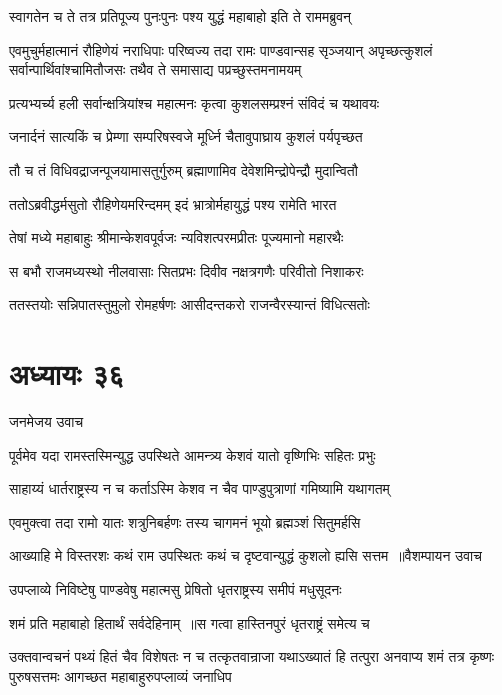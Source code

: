 \twolineshloka
{स्वागतेन च ते तत्र प्रतिपूज्य पुनःपुनः}
{पश्य युद्धं महाबाहो इति ते राममब्रुवन्}


एवमुचुर्महात्मानं रौहिणेयं नराधिपाः
\threelineshloka
{परिष्वज्य तदा रामः पाण्डवान्सह सृञ्जयान्}
{अपृच्छत्कुशलं सर्वान्पार्थिवांश्चामितौजसः}
{तथैव ते समासाद्य पप्रच्छुस्तमनामयम्}


\twolineshloka
{प्रत्यभ्यर्च्य हली सर्वान्क्षत्रियांश्च महात्मनः}
{कृत्वा कुशलसम्प्रश्नं संविदं च यथावयः}


\twolineshloka
{जनार्दनं सात्यकिं च प्रेम्णा सम्परिषस्वजे}
{मूर्ध्नि चैतावुपाघ्राय कुशलं पर्यपृच्छत}


\twolineshloka
{तौ च तं विधिवद्राजन्पूजयामासतुर्गुरुम्}
{ब्रह्माणामिव देवेशमिन्द्रोपेन्द्रौ मुदान्वितौ}


\twolineshloka
{ततोऽब्रवीद्धर्मसुतो रौहिणेयमरिन्दमम्}
{इदं भ्रात्रोर्महायुद्धं पश्य रामेति भारत}


\twolineshloka
{तेषां मध्ये महाबाहुः श्रीमान्केशवपूर्वजः}
{न्यविशत्परमप्रीतः पूज्यमानो महारथैः}


\twolineshloka
{स बभौ राजमध्यस्थो नीलवासाः सितप्रभः}
{दिवीव नक्षत्रगणैः परिवीतो निशाकरः}


\twolineshloka
{ततस्तयोः सन्निपातस्तुमुलो रोमहर्षणः}
{आसीदन्तकरो राजन्वैरस्यान्तं विधित्सतोः}


\chapter{अध्यायः ३६}
\twolineshloka
{जनमेजय उवाच}
{}


\twolineshloka
{पूर्वमेव यदा रामस्तस्मिन्युद्ध उपस्थिते}
{आमन्त्र्य केशवं यातो वृष्णिभिः सहितः प्रभुः}


\twolineshloka
{साहाय्यं धार्तराष्ट्रस्य न च कर्ताऽस्मि केशव}
{न चैव पाण्डुपुत्राणां गमिष्यामि यथागतम्}


\twolineshloka
{एवमुक्त्वा तदा रामो यातः शत्रुनिबर्हणः}
{तस्य चागमनं भूयो ब्रह्मञ्शं सितुमर्हसि}


\threelineshloka
{आख्याहि मे विस्तरशः कथं राम उपस्थितः}
{कथं च दृष्टवान्युद्धं कुशलो ह्यसि सत्तम ॥वैशम्पायन उवाच}
{}


\twolineshloka
{उपप्लाव्ये निविष्टेषु पाण्डवेषु महात्मसु}
{प्रेषितो धृतराष्ट्रस्य समीपं मधुसूदनः}


\twolineshloka
{शमं प्रति महाबाहो हितार्थं सर्वदेहिनाम् ॥स गत्वा हास्तिनपुरं धृतराष्ट्रं समेत्य च}
{}


उक्तवान्वचनं पथ्यं हितं चैव विशेषतः
न च तत्कृतवान्राजा यथाऽख्यातं हि तत्पुरा
\twolineshloka
{अनवाप्य शमं तत्र कृष्णः पुरुषसत्तमः}
{आगच्छत महाबाहुरुपप्लाव्यं जनाधिप}


